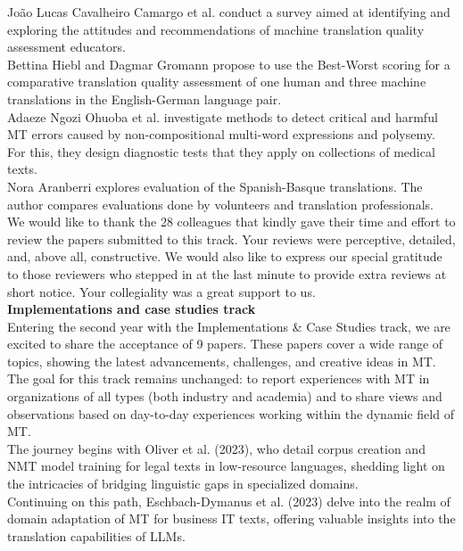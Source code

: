 João Lucas Cavalheiro Camargo et al. conduct a survey aimed at identifying and exploring the attitudes and recommendations of machine translation quality assessment educators.
\\

Bettina Hiebl and Dagmar Gromann propose to use the Best-Worst scoring for a comparative translation quality assessment of one human and three machine translations in the English-German language pair.
\\

Adaeze Ngozi Ohuoba et al. investigate methods to detect critical and harmful MT errors caused by non-compositional multi-word expressions and polysemy. For this, they design diagnostic tests that they apply on collections of medical texts.
\\

Nora Aranberri explores evaluation of the Spanish-Basque translations. The author compares evaluations done by volunteers and translation professionals.
\\

We would like to thank the 28 colleagues that kindly gave their time and effort to review the papers submitted to this track. Your reviews were perceptive, detailed, and, above all, constructive. We would also like to express our special gratitude to those reviewers who stepped in at the last minute to provide extra reviews at short notice. Your collegiality was a great support to us.
\\

{\bf Implementations and case studies track} 
\\

Entering the second year with the Implementations \& Case Studies track, we are excited to share the acceptance of 9 papers. These papers cover a wide range of topics, showing the latest advancements, challenges, and creative ideas in MT. The goal for this track remains unchanged: to report experiences with MT in organizations of all types (both industry and academia) and to share views and observations based on day-to-day experiences working within the dynamic field of MT.
\\

The journey begins with Oliver et al. (2023), who detail corpus creation and NMT model training for legal texts in low-resource languages, shedding light on the intricacies of bridging linguistic gaps in specialized domains.
\\

Continuing on this path, Eschbach-Dymanus et al. (2023) delve into the realm of domain adaptation of MT for business IT texts, offering valuable insights into the translation capabilities of LLMs.
\\

